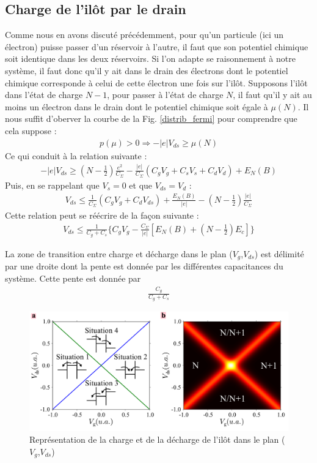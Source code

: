 \subsection{Charge de l'il\^ot par le drain}
Comme nous en avons discuté précédemment, pour qu'un particule (ici un électron) puisse passer d'un réservoir à l'autre, il faut que son potentiel chimique soit identique dans les deux réservoirs. Si l'on adapte se raisonnement à notre système, il faut donc qu'il y ait dans le drain des électrons dont le potentiel chimique corresponde à celui de cette électron une fois sur l'il\^ot. Supposons l'il\^ot dans l'état de charge $N-1$, pour passer à l'état de charge $N$, il faut qu'il y ait au moins un électron dans le drain dont le potentiel chimique soit égale à $\mu(N)$. Il nous suffit d'oberver la courbe de la Fig. \ref{distrib_fermi} pour comprendre que cela suppose :
\begin{eqnarray}
p(\mu) > 0 \Longrightarrow  -|e|V_{ds} \geq \mu(N) \nonumber
\end{eqnarray}
Ce qui conduit à la relation suivante :
\begin{eqnarray}
-|e|V_{ds} \geq (N-\frac{1}{2})\frac{e^2}{C_{\Sigma}}
-
\frac{|e|}{C_{\Sigma}}(C_gV_g + C_sV_s + C_dV_d)
+
E_N(B) \nonumber
\end{eqnarray}
Puis, en se rappelant que $V_s= 0$ et que $V_{ds} = V_d$ :
\begin{eqnarray}
V_{ds} \leq \frac{1}{C_{\Sigma}}(C_gV_g + C_dV_{ds}) + \frac{E_N(B)}{|e|} - (N-\frac{1}{2})\frac{|e|}{C_{\Sigma}} \nonumber
\end{eqnarray}
Cette relation peut se réécrire de la façon suivante :
\begin{eqnarray}
V_{ds} \leq \frac{1}{C_g + C_s} \{C_gV_g - \frac{C_{\Sigma}}{|e|}[E_N(B) + (N-\frac{1}{2})E_c] \}
\end{eqnarray}

La zone de transition entre charge et décharge dans le plan ($V_g$,$V_{ds}$) est délimité par une droite dont la pente est donnée par les différentes capacitances du système. Cette pente est donnée par 
\begin{eqnarray}
\frac{C_g}{C_g + C_s} \nonumber
\end{eqnarray}



\begin{figure}
\includegraphics[scale=0.5]{Theorie/Transport/figure3/figure3.pdf} 
\caption{Représentation de la charge et de la décharge de l'il\^ot dans le plan ($V_g$,$V_{ds}$)}
\label{charge_discharge}
\end{figure}



